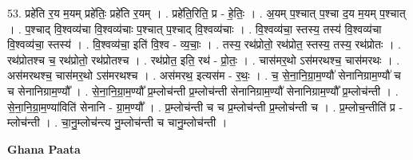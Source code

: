 \documentclass[17pt]{extarticle}
\begin{document}
53. प्रहे॑ति र॒य म॒यम् प्रहे॑तिः॒ प्रहे॑ति र॒यम् । . प्रहे॑ति॒रिति॒ प्र - हे॒तिः॒ । . अ॒यम् प॒श्चात् प॒श्चा द॒य म॒यम् प॒श्चात् । . प॒श्चाद् वि॒श्वव्य॑चा वि॒श्वव्य॑चाः प॒श्चात् प॒श्चाद् वि॒श्वव्य॑चाः । . वि॒श्वव्य॑चा॒ स्तस्य॒ तस्य॑ वि॒श्वव्य॑चा वि॒श्वव्य॑चा॒ स्तस्य॑ । . वि॒श्वव्य॑चा॒ इति॑ वि॒श्व - व्य॒चाः॒ । . तस्य॒ रथ॑प्रोतो॒ रथ॑प्रोत॒ स्तस्य॒ तस्य॒ रथ॑प्रोतः । . रथ॑प्रोतश्च च॒ रथ॑प्रोतो॒ रथ॑प्रोतश्च । . रथ॑प्रोत॒ इति॒ रथ॑ - प्रो॒तः॒ । . चास॑मर॒थो ऽस॑मरथश्च॒ चास॑मरथः । . अस॑मरथश्च॒ चास॑मर॒थो ऽस॑मरथश्च । . अस॑मरथ॒ इत्यस॑म - र॒थः॒ । . च॒ से॒ना॒नि॒ग्रा॒म॒ण्यौ॑ सेनानिग्राम॒ण्यौ॑ च च सेनानिग्राम॒ण्यौ᳚ । . से॒ना॒नि॒ग्रा॒म॒ण्यौ᳚ प्र॒म्लोच॑न्ती प्र॒म्लोच॑न्ती सेनानिग्राम॒ण्यौ॑ सेनानिग्राम॒ण्यौ᳚ प्र॒म्लोच॑न्ती । . से॒ना॒नि॒ग्रा॒म॒ण्या॑विति॑ सेनानि - ग्रा॒म॒ण्यौ᳚ । . प्र॒म्लोच॑न्ती च च प्र॒म्लोच॑न्ती प्र॒म्लोच॑न्ती च । . प्र॒म्लोच॒न्तीति॑ प्र - म्लोच॑न्ती । . चा॒नु॒म्लोच॑न्त्य नु॒म्लोच॑न्ती च चानु॒म्लोच॑न्ती । \newline

\textbf{Ghana Paata } \newline
\end{document}
